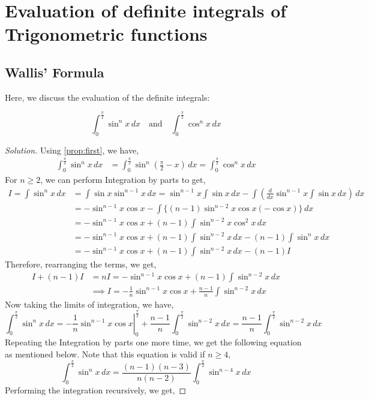 \documentclass{book}
\theoremstyle{definition}
\newenvironment{solution}
    {\begin{proof}[Solution]}
    {\end{proof}}
\begin{document}
\section {Evaluation of definite integrals of Trigonometric functions}

\subsection{Wallis' Formula}

Here, we discuss the evaluation of the definite integrals:

\[
\int_0^{\frac{\pi}{2}}\sin^n x\,dx \quad \text{and} \quad \displaystyle\int_0^{\frac{\pi}{2}}\cos^n x\,dx
\]

\begin{solution}
Using \ref{prop:first}, we have,
\begin{align*}
\int_0^{\frac{\pi}{2}}\sin^n x\,dx &= \int_0^{\frac{\pi}{2}}\sin^n(\frac{\pi}{2}-x)\,dx = \int_0^{\frac{\pi}{2}}\cos^n x\,dx
\end{align*}
For $n\geq2$, we can perform Integration by parts to get,
\begin{align*}
I=\int\sin^nx\,dx &= \int\sin x\sin^{n-1}x\,dx = \sin^{n-1} x\int\sin x\,dx-\int\left(\frac{d}{dx}\sin^{n-1} x\int\sin x\,dx\right)\,dx \\
&= -\sin^{n-1} x\cos x-\displaystyle\int\{(n-1)\sin^{n-2}x\cos x(-\cos x)\}\,dx \\
&= -\sin^{n-1} x\cos x+(n-1)\int\sin^{n-2}x\cos^2 x\,dx \\ 
&= -\sin^{n-1} x\cos x+(n-1)\int\sin^{n-2}x\,dx-(n-1)\int\sin^n x\,dx \\
&= -\sin^{n-1} x\cos x+(n-1)\int\sin^{n-2}x\,dx-(n-1)I
\end{align*}
Therefore, rearranging the terms, we get,
\begin{align*}
I+(n-1)I&=nI=-\sin^{n-1} x\cos x+(n-1)\int\sin^{n-2}x\,dx \\
&\implies I=-\frac{1}{n}\sin^{n-1} x\cos x+\frac{n-1}{n}\displaystyle\int\sin^{n-2}x\,dx
\end{align*}
Now taking the limits of integration, we have,
\[
\int_0^{\frac{\pi}{2}}\sin^n x\,dx=-\left.\frac{1}{n}\sin^{n-1} x\cos x\right\vert_0^{\frac{\pi}{2}}+\frac{n-1}{n}\int_0^{\frac{\pi}{2}}\sin^{n-2}x\,dx = \frac{n-1}{n}\displaystyle\int_0^{\frac{\pi}{2}}\sin^{n-2}x\,dx
\]
Repeating the Integration by parts one more time, we get the following equation as mentioned below. Note that this equation is valid if $n\geq4$,
\[
\int_0^{\frac{\pi}{2}}\sin^n x\,dx=\frac{(n-1)(n-3)}{n(n-2)}\int_0^{\frac{\pi}{2}}\sin^{n-4}x\,dx
\]
Performing the integration recursively, we get,


\end{solution}
\end{document}
